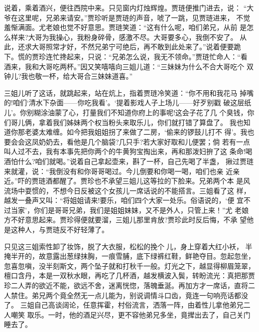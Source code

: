 说着，乘着酒兴，便往西院中来。只见窗内灯烛辉煌。贾琏便推门进去，说：
“大爷在这里呢，兄弟来请安。”贾珍听是贾琏的声音，唬了一跳，见贾琏进来，
不觉羞惭满面。尤老娘也觉不好意思。贾琏笑道：“这有什么呢，咱们弟兄，从前
是怎么样来?大哥为我操心，我粉身碎骨，感激不尽。大哥要多心，我倒不安了。
从此，还求大哥照常才好，不然兄弟宁可绝后，再不敢到此处来了。”说着便要跪
下。慌的贾珍连忙搀起来，只说：“兄弟怎么说，我无不领命。”贾琏忙命人：“看
酒来，我和大哥吃两杯。”因又笑嘻嘻向三姐儿道：“三妹妹为什么不合大哥吃个
双钟儿?我也敬一杯，给大哥合三妹妹道喜。”

三姐儿听了这话，就跳起来，站在炕上，指着贾琏冷笑道：“你不用和我花马
掉嘴的!咱们‘清水下杂面——你吃我看’。‘提着影戏人子上场儿——好歹别戳
破这层纸儿’。你别糊涂油蒙了心，打量我们不知道你府上的事呢!这会子花了几
个臭钱，你们哥儿俩，拿着我们姊妹两个权当粉头来取乐儿，你们就打错了算盘了。
我也知道你那老婆太难缠。如今把我姐姐拐了来做了二房，‘偷来的锣鼓儿打不
得’。我也要会会这凤奶奶去，看他是几个脑袋?几只手?若大家好取和儿便罢；倘
若有一点叫人过不去，我有本事先把你两个的牛黄狗宝掏出来，再和那泼妇拚了这
条命!喝酒怕什么?咱们就喝。”说着自己拿起壶来，斟了一杯，自己先喝了半盏，
揪过贾琏来就灌，说：“我倒没有和你哥哥喝过。今儿倒要和你喝一喝，咱们也亲
近亲近。”吓的贾琏酒都醒了。贾珍也不承望三姐儿这等拉的下脸来。兄弟两个本
是风流场中耍惯的，不想今日反被这个女孩儿一席话说的不能搭言。三姐看了这
样，越发一叠声又叫：“将姐姐请来!要乐，咱们四个大家一处乐。俗语说的，‘便
宜不过当家’，你们是哥哥兄弟，我们是姐姐妹妹，又不是外人，只管上来！”尤
老娘方不好意思起来。贾珍得便就要溜，三姐儿那里肯放?贾珍此时反后悔，不承
望他是这种人，与贾琏反不好轻薄了。

只见这三姐索性卸了妆饰，脱了大衣服，松松的挽个儿，身上穿着大红小袄，
半掩半开的，故意露出葱绿抹胸，一痕雪脯，底下绿裤红鞋，鲜艳夺目。忽起忽坐，
忽喜忽嗔，没半刻斯文，两个坠子就和打秋千一般。灯光之下，越显得柳眉笼翠，
檀口含丹，本是一双秋水眼，再吃了几杯酒，越发横波入鬓，转盼流光：真把那贾
珍二人弄的欲近不能，欲远不舍，迷离恍惚，落魄垂涎。再加方才一席话，直将二
人禁住。弟兄两个竟全然无一点儿能为，别说调情斗口齿，竟连一句响亮话都没了。
三姐自己高谈阔论，任意挥霍，村俗流言，洒落一阵，由着性儿拿他弟兄二人嘲笑
取乐。一时，他的酒足兴尽，更不容他弟兄多坐，竟撵出去了，自己关门睡去了。

